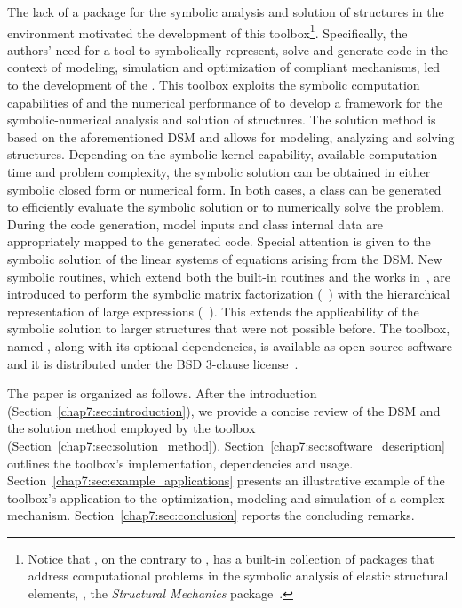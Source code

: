 The lack of a package for the symbolic analysis and solution of structures in the \Maple{} environment motivated the development of this toolbox\footnote{Notice that \Mathematica{}, on the contrary to \Maple{}, has a built-in collection of packages that address computational problems in the symbolic analysis of elastic structural elements, \ie{}, the \emph{Structural Mechanics} package~\cite{structuralmechanics}.}. Specifically, the authors' need for a tool to symbolically represent, solve and generate code in the context of modeling, simulation and optimization of compliant mechanisms, led to the development of the \TrussMe{}. This toolbox exploits the symbolic computation capabilities of \Maple{} and the numerical performance of \Matlab{} to develop a framework for the symbolic-numerical analysis and solution of structures. The solution method is based on the aforementioned \ac{DSM} and allows for modeling, analyzing and solving structures. Depending on the symbolic kernel capability, available computation time and problem complexity, the symbolic solution can be obtained in either symbolic closed form or numerical form. In both cases, a \Matlab{} class can be generated to efficiently evaluate the symbolic solution or to numerically solve the problem. During the code generation, model inputs and class internal data are appropriately mapped to the generated code. Special attention is given to the symbolic solution of the linear systems of equations arising from the \ac{DSM}. New symbolic routines, which extend both the built-in \Maple{} routines and the works in~\cite{carette2006linear, zhou2007symbolic}, are introduced to perform the symbolic matrix factorization (\LAST{}~\cite{last}) with the hierarchical representation of large expressions (\LEM{}~\cite{lem}). This extends the applicability of the symbolic solution to larger structures that were not possible before. The toolbox, named \TrussMe{}, along with its optional dependencies, is available as open-source software and it is distributed under the BSD 3-clause license~\cite{trussme}.

The paper is organized as follows. After the introduction (Section~\ref{chap7:sec:introduction}), we provide a concise review of the \ac{DSM} and the solution method employed by the toolbox (Section~\ref{chap7:sec:solution_method}). Section~\ref{chap7:sec:software_description} outlines the toolbox's implementation, dependencies and usage. Section~\ref{chap7:sec:example_applications} presents an illustrative example of the toolbox's application to the optimization, modeling and simulation of a complex mechanism. Section~\ref{chap7:sec:conclusion} reports the concluding remarks.

